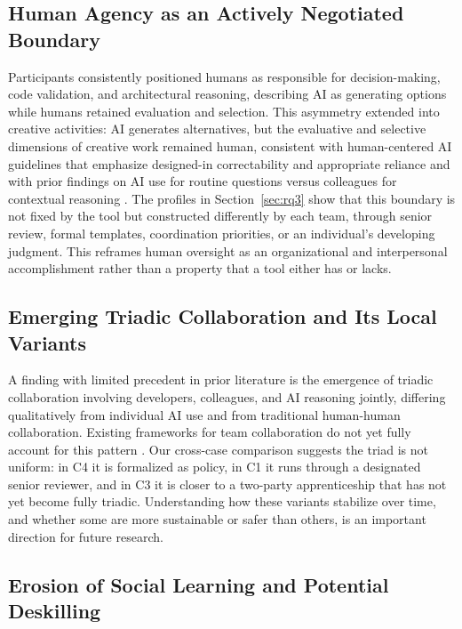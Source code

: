 \documentclass[10pt,journal,compsoc]{IEEEtran}
\begin{document}
\subsection{Human Agency as an Actively Negotiated Boundary}

Participants consistently positioned humans as responsible for decision-making, code validation, and architectural reasoning, describing AI as generating options while humans retained evaluation and selection. This asymmetry extended into creative activities: AI generates alternatives, but the evaluative and selective dimensions of creative work remained human, consistent with human-centered AI guidelines that emphasize designed-in correctability and appropriate reliance \cite{amershi2019} and with prior findings on AI use for routine questions versus colleagues for contextual reasoning \cite{salomon2026}. The profiles in Section~\ref{sec:rq3} show that this boundary is not fixed by the tool but constructed differently by each team, through senior review, formal templates, coordination priorities, or an individual's developing judgment. This reframes human oversight as an organizational and interpersonal accomplishment rather than a property that a tool either has or lacks.

\subsection{Emerging Triadic Collaboration and Its Local Variants}

A finding with limited precedent in prior literature is the emergence of triadic collaboration involving developers, colleagues, and AI reasoning jointly, differing qualitatively from individual AI use and from traditional human-human collaboration. Existing frameworks for team collaboration do not yet fully account for this pattern \cite{seeber2020}. Our cross-case comparison suggests the triad is not uniform: in C4 it is formalized as policy, in C1 it runs through a designated senior reviewer, and in C3 it is closer to a two-party apprenticeship that has not yet become fully triadic. Understanding how these variants stabilize over time, and whether some are more sustainable or safer than others, is an important direction for future research.

\subsection{Erosion of Social Learning and Potential Deskilling}
\end{document}
